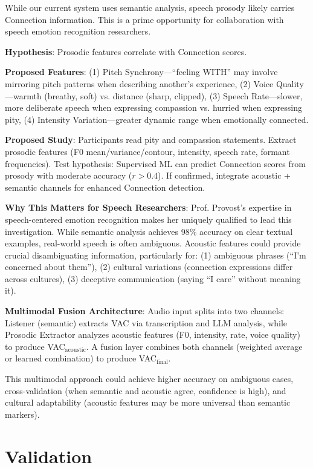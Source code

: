 \documentclass[10pt,twocolumn]{article}
\begin{document}
While our current system uses semantic analysis, speech prosody likely carries Connection information. This is a prime opportunity for collaboration with speech emotion recognition researchers.

\textbf{Hypothesis}: Prosodic features correlate with Connection scores.

\textbf{Proposed Features}: (1) Pitch Synchrony—``feeling WITH'' may involve mirroring pitch patterns when describing another's experience, (2) Voice Quality—warmth (breathy, soft) vs. distance (sharp, clipped), (3) Speech Rate—slower, more deliberate speech when expressing compassion vs. hurried when expressing pity, (4) Intensity Variation—greater dynamic range when emotionally connected.

\textbf{Proposed Study}: Participants read pity and compassion statements. Extract prosodic features (F0 mean/variance/contour, intensity, speech rate, formant frequencies). Test hypothesis: Supervised ML can predict Connection scores from prosody with moderate accuracy ($r > 0.4$). If confirmed, integrate acoustic + semantic channels for enhanced Connection detection.

\textbf{Why This Matters for Speech Researchers}: Prof. Provost's expertise in speech-centered emotion recognition makes her uniquely qualified to lead this investigation. While semantic analysis achieves 98\% accuracy on clear textual examples, real-world speech is often ambiguous. Acoustic features could provide crucial disambiguating information, particularly for: (1) ambiguous phrases (``I'm concerned about them''), (2) cultural variations (connection expressions differ across cultures), (3) deceptive communication (saying ``I care'' without meaning it).

\textbf{Multimodal Fusion Architecture}: Audio input splits into two channels: Listener (semantic) extracts VAC via transcription and LLM analysis, while Prosodic Extractor analyzes acoustic features (F0, intensity, rate, voice quality) to produce VAC$_{\text{acoustic}}$. A fusion layer combines both channels (weighted average or learned combination) to produce VAC$_{\text{final}}$.

This multimodal approach could achieve higher accuracy on ambiguous cases, cross-validation (when semantic and acoustic agree, confidence is high), and cultural adaptability (acoustic features may be more universal than semantic markers).

\section{Validation}
\label{sec:validation}
\end{document}

